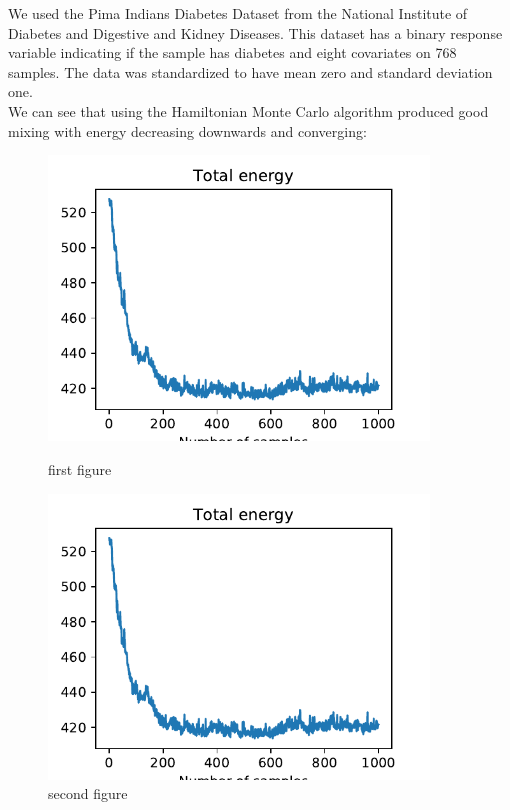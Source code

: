 We used the Pima Indians Diabetes Dataset from the National Institute of Diabetes and Digestive and Kidney Diseases. This dataset has a binary response variable indicating if the sample has diabetes and eight covariates on 768 samples. The data was standardized to have mean zero and standard deviation one.\\

We can see that using the Hamiltonian Monte Carlo algorithm produced good mixing with energy decreasing downwards and converging:

\begin{figure}[h!]
	\centering
	\begin{minipage}{0.45\textwidth}
		\centering
		\includegraphics[width=0.9\textwidth]{hmc-energy-pima.pdf} %
		\caption{first figure}
	\end{minipage}\hfill
	\begin{minipage}{0.45\textwidth}
		\centering
		\includegraphics[width=0.9\textwidth]{hmc-energy-pima.pdf} %
		\caption{second figure}
	\end{minipage}
\end{figure}

